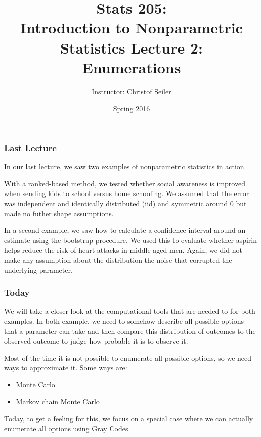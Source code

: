 \documentclass[10pt]{beamer}
\title{\large \bfseries Stats 205: \\ Introduction to Nonparametric Statistics \linebreak \linebreak \linebreak
Lecture 2: \\ Enumerations}
\author{Instructor: Christof Seiler}
\date{Spring 2016}
\begin{document}
\frame{
\thispagestyle{empty}
\titlepage
}

\begin{frame}
\frametitle{Last Lecture}

In our last lecture, we saw two examples of nonparametric statistics in action. \newline

With a ranked-based method, we tested whether social awareness is improved when sending kids to school versus home schooling.
We assumed that the error was independent and identically distributed (iid) and symmetric around $0$ but made no futher shape assumptions. \newline

In a second example, we saw how to calculate a confidence interval around an estimate using the bootstrap procedure. We used this to evaluate whether aspirin helps reduce the risk of heart attacks in middle-aged men. 
Again, we did not make any assumption about the distribution the noise that corrupted the underlying parameter. 

\end{frame}

\begin{frame}
\frametitle{Today}

We will take a closer look at the computational tools that are needed to for both examples. In both example, we need to somehow describe all possible options that a parameter can take and then compare this distribution of outcomes to the observed outcome to judge how probable it is to observe it. \newline

Most of the time it is not possible to enumerate all possible options, so we need ways to approximate it. Some ways are:
\begin{itemize}
\item Monte Carlo
\item Markov chain Monte Carlo
\end{itemize}

\vspace{0.3cm}
Today, to get a feeling for this, we focus on a special case where we can actually enumerate all options using Gray Codes.

\end{frame}
\end{document}

